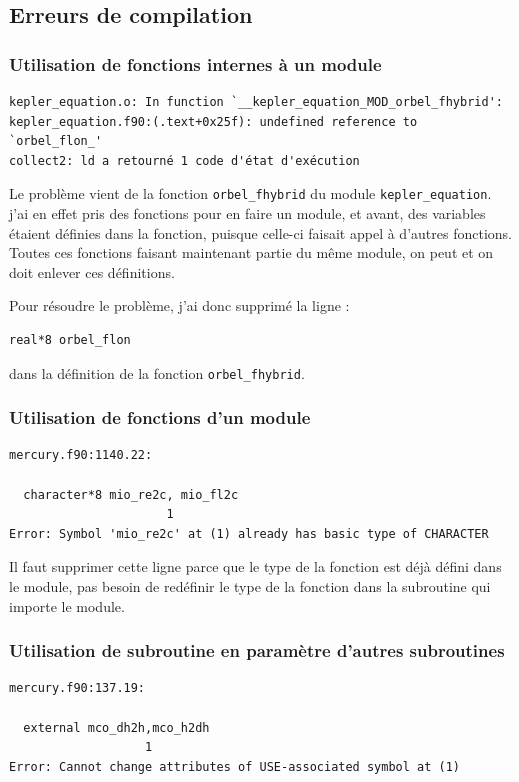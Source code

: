 \documentclass[a4paper,twoside]{article}
\begin{document}
\subsection{Erreurs de compilation}
\subsubsection{Utilisation de fonctions internes à un module}
\begin{verbatim}
kepler_equation.o: In function `__kepler_equation_MOD_orbel_fhybrid':
kepler_equation.f90:(.text+0x25f): undefined reference to `orbel_flon_'
collect2: ld a retourné 1 code d'état d'exécution
\end{verbatim}

Le problème vient de la fonction \verb|orbel_fhybrid| du module \verb|kepler_equation|. j'ai en effet pris des fonctions pour en faire un module, et avant, des variables étaient définies dans la fonction, puisque celle-ci faisait appel à d'autres fonctions. Toutes ces fonctions faisant maintenant partie du même module, on peut et on doit enlever ces définitions. 

Pour résoudre le problème, j'ai donc supprimé la ligne : 
\begin{verbatim}
real*8 orbel_flon
\end{verbatim}
dans la définition de la fonction \verb|orbel_fhybrid|.

\subsubsection{Utilisation de fonctions d'un module}
\begin{verbatim}
mercury.f90:1140.22:

  character*8 mio_re2c, mio_fl2c
                      1
Error: Symbol 'mio_re2c' at (1) already has basic type of CHARACTER
\end{verbatim}
Il faut supprimer cette ligne parce que le type de la fonction est déjà défini dans le module, pas besoin de redéfinir le type de la fonction dans la subroutine qui importe le module.

\subsubsection{Utilisation de subroutine en paramètre d'autres subroutines}
\begin{verbatim}
mercury.f90:137.19:

  external mco_dh2h,mco_h2dh
                   1
Error: Cannot change attributes of USE-associated symbol at (1)
\end{verbatim}
\end{document}
